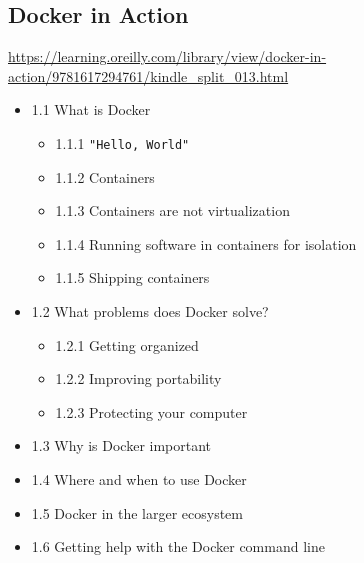 \begin{myitems}
\end{myitems}\begin{mybox}
\section{Docker in Action}
\label{sec:orgf9c5535}
\tcblower{}
\url{https://learning.oreilly.com/library/view/docker-in-action/9781617294761/kindle\_split\_013.html}
\end{mybox}\begin{myitems}
\begin{itemize}
\item 1.1 What is Docker
\begin{itemize}
\item 1.1.1 \texttt{"Hello, World"}
\item 1.1.2 Containers
\item 1.1.3 Containers are not virtualization
\item 1.1.4 Running software in containers for isolation
\item 1.1.5 Shipping containers
\end{itemize}
\item 1.2 What problems does Docker solve?
\begin{itemize}
\item 1.2.1 Getting organized
\item 1.2.2 Improving portability
\item 1.2.3 Protecting your computer
\end{itemize}
\item 1.3 Why is Docker important
\item 1.4 Where and when to use Docker
\item 1.5 Docker in the larger ecosystem
\item 1.6 Getting help with the Docker command line
\end{itemize}

\end{myitems}\begin{mybox}

\end{mybox}
